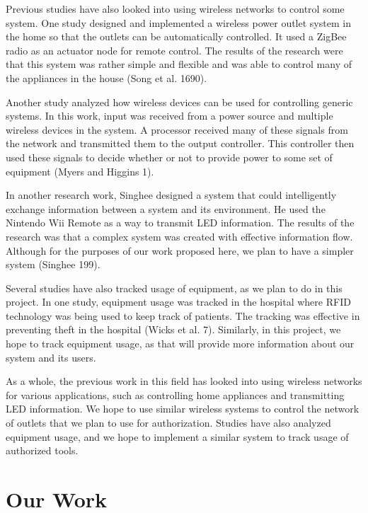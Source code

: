 \documentclass{sigchi}
\begin{document}
Previous studies have also looked into using wireless networks to control some system. One study designed and implemented a wireless power outlet system in the home so that the outlets can be automatically controlled. It used a ZigBee radio as an actuator node for remote control. The results of the research were that this system was rather simple and flexible and was able to control many of the appliances in the house (Song et al. 1690). 

Another study analyzed how wireless devices can be used for controlling generic systems. In this work, input was received from a power source and multiple wireless devices in the system. A processor received many of these signals from the network and transmitted them to the output controller. This controller then used these signals to decide whether or not to provide power to some set of equipment (Myers and Higgins 1).

In another research work, Singhee designed a system that could intelligently exchange information between a system and its environment. He used the Nintendo Wii Remote as a way to transmit LED information. The results of the research was that a complex system was created with effective information flow. Although for the purposes of our work proposed here, we plan to have a simpler system (Singhee 199).

Several studies have also tracked usage of equipment, as we plan to do in this project. In one study, equipment usage was tracked in the hospital where RFID technology was being used to keep track of patients. The tracking was effective in preventing theft in the hospital (Wicks et al. 7). Similarly, in this project, we hope to track equipment usage, as that will provide more information about our system and its users.

As a whole, the previous work in this field has looked into using wireless networks for various applications, such as controlling home appliances and transmitting LED information. We hope to use similar wireless systems to control the network of outlets that we plan to use for authorization. Studies have also analyzed equipment usage, and we hope to implement a similar system to track usage of authorized tools.

\section{Our Work}
\end{document}

